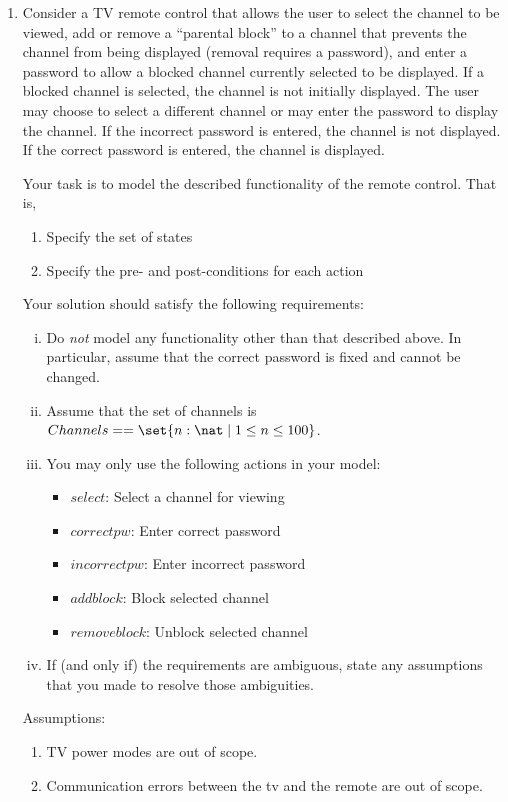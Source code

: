 \documentclass{article}
\begin{document}
\begin{enumerate}
\begin{enumerate}
\end{enumerate}

\item Consider a TV remote control that allows the user to select
the channel to be viewed, add or remove a ``parental block'' to a
channel that prevents the channel from being displayed (removal
requires a password), and enter a password to allow a blocked
channel currently selected to be displayed. If a blocked channel
is selected, the channel is not initially displayed. The user may
choose to select a different channel or may enter the password to
display the channel. If the incorrect password is entered, the
channel is not displayed. If the correct password is entered, the
channel is displayed.

Your task is to model the described functionality of the remote control. That is,
\begin{enumerate}
\item Specify the set of states

\item Specify the pre- and post-conditions for each action
\end{enumerate}

Your solution should satisfy the following requirements:
\begin{enumerate}[i.]
\item Do \emph{not} model any functionality other than that described above. In particular, assume that the correct password is fixed and cannot be changed.
\item Assume that the set of channels is $Channels == \set{n:\nat \mid 1 \leq n \leq 100}$.
\item You may only use the following actions in your model:
    \begin{itemize}
    \item $select$: Select a channel for viewing
    \item $correctpw$: Enter correct password
    \item $incorrectpw$: Enter incorrect password
    \item $addblock$: Block selected channel
    \item $removeblock$: Unblock selected channel
    \end{itemize}
  \item If (and only if) the requirements are ambiguous, state any assumptions that you made to resolve those ambiguities. \\
\end{enumerate}
Assumptions:
\begin{enumerate}
\item TV power modes are out of scope.
\item Communication errors between the tv and the remote are out of scope.
\end{enumerate}


\end{enumerate}
\end{document}

